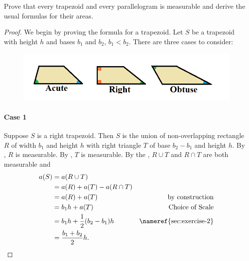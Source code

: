 \documentclass{article}
\begin{document}
\section*{}%
%

Prove that every trapezoid and every parallelogram is measurable and derive the
  usual formulas for their areas.

\begin{proof}

  We begin by proving the formula for a trapezoid.
  Let $S$ be a trapezoid with height $h$ and bases $b_1$ and $b_2$, $b_1 < b_2$.
  There are three cases to consider:

  \begin{figure}[h]
    \includegraphics[width=\textwidth]{trapezoid-cases}
    \centering
  \end{figure}

  \paragraph{Case 1}%

    Suppose $S$ is a right trapezoid.
    Then $S$ is the union of non-overlapping rectangle $R$ of width $b_1$ and
      height $h$ with right triangle $T$ of base $b_2 - b_1$ and height $h$.
    By , $R$ is measurable.
    By , $T$ is measurable.
    By the , $R \cup T$ and $R \cap T$ are both
      measurable and
      \begin{align*}
        a(S)
          & = a(R \cup T) \\
          & = a(R) + a(T) - a(R \cap T) \\
          & = a(R) + a(T) & \text{by construction} \\
          & = b_1h + a(T) & \text{Choice of Scale} \\
          & = b_1h + \frac{1}{2}(b_2 - b_1)h
            & \text{\nameref{sec:exercise-2}} \\
          & = \frac{b_1 + b_2}{2}h.
      \end{align*}


\end{proof}
\end{document}
